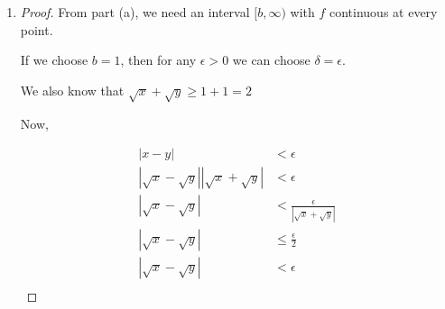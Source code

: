 \documentclass[12pt,letterpaper]{article}
\newcommand\uc{uniformly continuous }
\begin{document}
\begin{enumerate}
\begin{enumerate}
\begin{enumerate}
\begin{proof}
                Assume that $f$ is not \uc on $[0, \infty)$,
                then we want to show that for any $b > 0$ $f$ is not \uc on $[b, \infty)$.

                We can rephrase the first part as:

                There exists some $\epsilon_0 > 0$ such that for all $\delta_0 > 0$,
                $|x - y| < \delta_0$ and $|f(x) - f(y)| \geq \epsilon_0$.

                And the second part as for any $b > 0$, there exists some $\epsilon_1 > 0$ such that
                for all $\delta_1 > 0$,
                $|x - y| < \delta_1$ and $|f(x) - f(y)| \geq \epsilon_1$.

                If we choose $\epsilon_0 = \epsilon_1$,
                then for any $\delta_1 > 0$ there exists some $0 < \delta_0 < \delta_1$,

                where $|x - y| < \delta_0$ and $|f(x) - f(y)| \geq \epsilon_0$.

                Then we have that $f$ is not \uc, as we desired.

                Thus, by contraposition:


                Given $f : [0, \infty) \to \mathbb{R}$ is continuous at every point in $[0, \infty)$,
                if there exists some $b > 0$ such that $f$ is \uc on $[b, \infty)$,
                then $f$ is \uc on $[0, \infty)$.
              \end{proof}
            \item
              \begin{proof}
                From part (a), we need an interval $[b, \infty)$ with $f$ continuous at every point.

                If we choose $b = 1$,
                then for any $\epsilon > 0$ we can choose $\delta = \epsilon$.

                We also know that $\sqrt{x} + \sqrt{y} \geq 1 + 1 = 2$

                Now,

                \begin{align*}
                  |x - y| &< \epsilon \\
                  |\sqrt{x} - \sqrt{y}||\sqrt{x} + \sqrt{y}| &< \epsilon \\
                  |\sqrt{x} - \sqrt{y}| &< \frac{\epsilon}{|\sqrt{x} + \sqrt{y}|} \\
                  |\sqrt{x} - \sqrt{y}| &\leq \frac{\epsilon}{2} \\
                  |\sqrt{x} - \sqrt{y}| &< \epsilon \\
                \end{align*}


\end{proof}
\end{enumerate}
\end{enumerate}
\end{enumerate}
\end{document}
